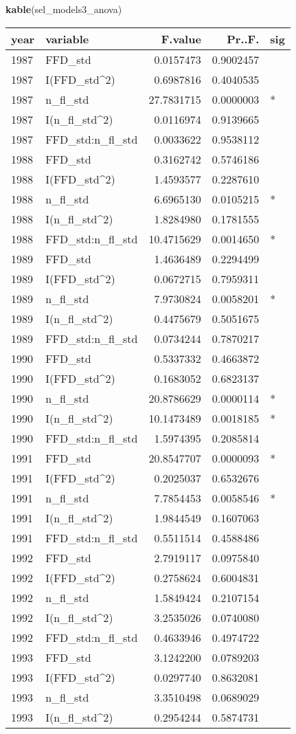 \documentclass[]{article}
\newenvironment{Shaded}{\begin{snugshade}}{\end{snugshade}}
\newcommand{\KeywordTok}[1]{\textcolor[rgb]{0.13,0.29,0.53}{\textbf{#1}}}
\newcommand{\NormalTok}[1]{#1}
\begin{document}
\begin{Shaded}
\begin{Highlighting}[]
\KeywordTok{kable}\NormalTok{(sel_models3_anova)}
\end{Highlighting}
\end{Shaded}

\begin{longtable}[]{@{}llrrl@{}}
\toprule
year & variable & F.value & Pr..F. & sig\tabularnewline
\midrule
\endhead
1987 & FFD\_std & 0.0157473 & 0.9002457 &\tabularnewline
1987 & I(FFD\_std\^{}2) & 0.6987816 & 0.4040535 &\tabularnewline
1987 & n\_fl\_std & 27.7831715 & 0.0000003 & *\tabularnewline
1987 & I(n\_fl\_std\^{}2) & 0.0116974 & 0.9139665 &\tabularnewline
1987 & FFD\_std:n\_fl\_std & 0.0033622 & 0.9538112 &\tabularnewline
1988 & FFD\_std & 0.3162742 & 0.5746186 &\tabularnewline
1988 & I(FFD\_std\^{}2) & 1.4593577 & 0.2287610 &\tabularnewline
1988 & n\_fl\_std & 6.6965130 & 0.0105215 & *\tabularnewline
1988 & I(n\_fl\_std\^{}2) & 1.8284980 & 0.1781555 &\tabularnewline
1988 & FFD\_std:n\_fl\_std & 10.4715629 & 0.0014650 & *\tabularnewline
1989 & FFD\_std & 1.4636489 & 0.2294499 &\tabularnewline
1989 & I(FFD\_std\^{}2) & 0.0672715 & 0.7959311 &\tabularnewline
1989 & n\_fl\_std & 7.9730824 & 0.0058201 & *\tabularnewline
1989 & I(n\_fl\_std\^{}2) & 0.4475679 & 0.5051675 &\tabularnewline
1989 & FFD\_std:n\_fl\_std & 0.0734244 & 0.7870217 &\tabularnewline
1990 & FFD\_std & 0.5337332 & 0.4663872 &\tabularnewline
1990 & I(FFD\_std\^{}2) & 0.1683052 & 0.6823137 &\tabularnewline
1990 & n\_fl\_std & 20.8786629 & 0.0000114 & *\tabularnewline
1990 & I(n\_fl\_std\^{}2) & 10.1473489 & 0.0018185 & *\tabularnewline
1990 & FFD\_std:n\_fl\_std & 1.5974395 & 0.2085814 &\tabularnewline
1991 & FFD\_std & 20.8547707 & 0.0000093 & *\tabularnewline
1991 & I(FFD\_std\^{}2) & 0.2025037 & 0.6532676 &\tabularnewline
1991 & n\_fl\_std & 7.7854453 & 0.0058546 & *\tabularnewline
1991 & I(n\_fl\_std\^{}2) & 1.9844549 & 0.1607063 &\tabularnewline
1991 & FFD\_std:n\_fl\_std & 0.5511514 & 0.4588486 &\tabularnewline
1992 & FFD\_std & 2.7919117 & 0.0975840 &\tabularnewline
1992 & I(FFD\_std\^{}2) & 0.2758624 & 0.6004831 &\tabularnewline
1992 & n\_fl\_std & 1.5849424 & 0.2107154 &\tabularnewline
1992 & I(n\_fl\_std\^{}2) & 3.2535026 & 0.0740080 &\tabularnewline
1992 & FFD\_std:n\_fl\_std & 0.4633946 & 0.4974722 &\tabularnewline
1993 & FFD\_std & 3.1242200 & 0.0789203 &\tabularnewline
1993 & I(FFD\_std\^{}2) & 0.0297740 & 0.8632081 &\tabularnewline
1993 & n\_fl\_std & 3.3510498 & 0.0689029 &\tabularnewline
1993 & I(n\_fl\_std\^{}2) & 0.2954244 & 0.5874731 &\tabularnewline

\end{longtable}
\end{document}

